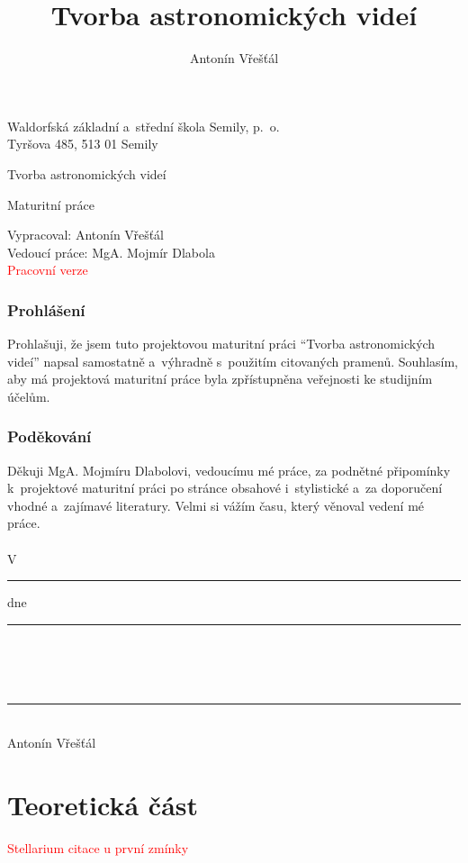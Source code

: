 \documentclass[12pt,a4paper,titlepage]{article}
\author{Antonín Vřešťál}
\title{Tvorba astronomických videí}
\newcommand{\todo}[1]{\textcolor{red}{#1}}
\begin{document}
\begin{titlepage}
	\begin{center}
		Waldorfská základní a~střední škola Semily, p.\  o.\\
		Tyršova 485, 513 01 Semily
		\vspace*{1cm}
 
		\vfill		

		\Huge
		Tvorba astronomických videí
 
		\normalsize
		\vspace{0.5cm}
		Maturitní práce 	 
		 
		\vfill		
	\end{center}
	Vypracoval: Antonín Vřešťál\\
	Vedoucí práce: MgA. Mojmír Dlabola\\
	\todo{Pracovní verze}\\
 \end{titlepage}
\newpage
\section*{Prohlášení}
Prohlašuji, že jsem tuto projektovou maturitní práci \enquote{Tvorba astronomických videí} napsal samostatně a~výhradně s~použitím citovaných pramenů. Souhlasím, aby má projektová maturitní práce byla zpřístupněna veřejnosti ke studijním účelům.
\section*{Poděkování}
Děkuji MgA. Mojmíru Dlabolovi, vedoucímu mé práce, za podnětné připomínky k~projektové maturitní práci po stránce obsahové i~stylistické a~za doporučení vhodné a~zajímavé literatury. Velmi si vážím času, který věnoval vedení mé práce.\\
\\
V \hspace{0.05cm} \rule[-3pt]{4cm}{0.5pt} \hspace{0.05cm} dne \hspace{0.05cm} \rule[-3pt]{4cm}{0.5pt}\\
\\
\\
\hspace{0.5cm} \rule[-3pt]{5.5cm}{0.5pt}\\
\indent \indent Antonín Vřešťál\\

\newpage
\tableofcontents
\newpage
\part{Teoretická část}
\todo{Stellarium citace u první zmínky}
\end{document}
